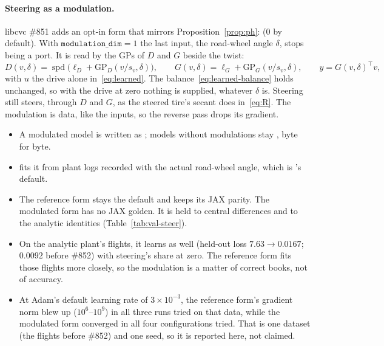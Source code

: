 \documentclass[11pt]{article}
\theoremstyle{remark}
\newcommand{\T}{^{\top}}
\begin{document}
\paragraph{Steering as a modulation.} libcvc \#851 adds an opt-in form that mirrors
Proposition~\ref{prop:ph}:  (0 by default). With
$\texttt{modulation\_dim}=1$ the last input, the road-wheel angle $\delta$, stops being a port. It is
read by the GPs of $D$ and $G$ beside the twist:
\begin{equation}
  D(v,\delta)=\operatorname{spd}\big(\ell_D+\mathrm{GP}_D(v/s_v,\delta)\big),\qquad
  G(v,\delta)=\ell_G+\mathrm{GP}_G(v/s_v,\delta),\qquad y=G(v,\delta)\T v,
  \label{eq:learned-mod}
\end{equation}
with $u$ the drive alone in~\eqref{eq:learned}. The balance~\eqref{eq:learned-balance} holds
unchanged, so with the drive at zero nothing is supplied, whatever $\delta$ is. Steering still steers,
through $D$ and $G$, as the steered tire's secant does in~\eqref{eq:R}. The modulation is data, like
the inputs, so the reverse pass drops its gradient.
\begin{itemize}
  \item A modulated model is written as ; models without modulations stay
        , byte for byte.
  \item {} fits it from plant logs recorded with the actual
        road-wheel angle, which is 's default.
  \item The reference form stays the default and keeps its JAX parity. The modulated form has no
        JAX golden. It is held to central differences and to the analytic identities
        (Table~\ref{tab:val-steer}).
  \item On the analytic plant's flights, it learns as well (held-out loss $7.63\to0.0167$;
        $0.0092$ before \#852) with steering's share at zero. The reference form fits those flights more closely, so the
        modulation is a matter of correct books, not of accuracy.
  \item At Adam's default learning rate of $3\times10^{-3}$, the reference form's gradient norm blew
        up ($10^6$--$10^9$) in all three runs tried on that data, while the modulated form
        converged in all four configurations tried. That is one dataset (the flights before
        \#852) and one seed, so it is reported here, not claimed.
\end{itemize}
\end{document}
